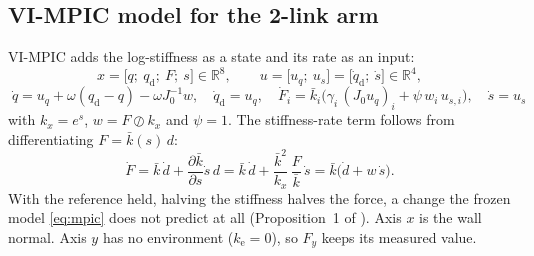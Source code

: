 \documentclass[11pt,a4paper]{article}
\newcommand{\kb}{\bar{k}}
\newcommand{\qd}{q_{\mathrm{d}}}
\newcommand{\dqd}{\dot{q}_{\mathrm{d}}}
\newcommand{\ke}{k_{\mathrm{e}}}
\newcommand{\kx}{k_{x}}
\begin{document}
\subsection{VI-MPIC model for the 2-link arm}
VI-MPIC adds the log-stiffness as a state and its rate as an input:
\begin{equation}
x=\bigl[q;\ \qd;\ F;\ s\bigr]\in\mathbb{R}^8,\qquad u=\bigl[u_q;\ u_s\bigr]=\bigl[\dqd;\ \dot s\bigr]\in\mathbb{R}^4 ,
\end{equation}
\begin{equation}\label{eq:vimpic}
\boxed{\;\dot q=u_q+\omega(\qd-q)-\omega J_0^{-1}w,\quad
\dqd=u_q,\quad
\dot F_i=\kb_i\bigl(\gamma_i\,(J_0u_q)_i+\psi\,w_i\,u_{s,i}\bigr),\quad
\dot s=u_s\;}
\end{equation}
with $\kx=e^s$, $w=F\oslash\kx$ and $\psi=1$. The stiffness-rate term follows from differentiating
$F=\kb(s)\,d$:
\begin{equation}
\dot F=\kb\,\dot d+\frac{\partial\kb}{\partial s}\dot s\,d
=\kb\,\dot d+\frac{\kb^2}{\kx}\,\frac{F}{\kb}\,\dot s
=\kb\bigl(\dot d+w\,\dot s\bigr).
\end{equation}
With the reference held, halving the stiffness halves the force, a change the frozen model
\eqref{eq:mpic} does not predict at all (Proposition~1 of \cite{notes}). Axis $x$ is the wall normal.
Axis $y$ has no environment ($\ke=0$), so $F_y$ keeps its measured value.
\end{document}
